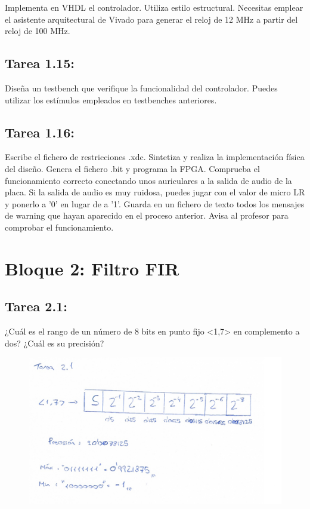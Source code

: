 \documentclass{article}
\begin{document}
Implementa en VHDL el controlador. Utiliza estilo estructural. Necesitas emplear el asistente arquitectural de Vivado para generar el reloj de 12 MHz a partir del reloj de 100 MHz.

\subsection{Tarea 1.15:}

Diseña un testbench que verifique la funcionalidad del controlador. Puedes utilizar los estímulos empleados en testbenches anteriores.

\subsection{Tarea 1.16:}

Escribe el fichero de restricciones .xdc. Sintetiza y realiza la implementación física del diseño. Genera el fichero .bit y programa la FPGA. Comprueba el funcionamiento correcto conectando unos auriculares a la salida de audio de la placa. Si la salida de audio es muy ruidosa, puedes jugar con el valor de micro LR y ponerlo a ’0’ en lugar de a '1'.
Guarda en un fichero de texto todos los mensajes de warning que hayan aparecido en el proceso anterior.
Avisa al profesor para comprobar el funcionamiento.

\section{Bloque 2: Filtro FIR}

\subsection{Tarea 2.1:}
¿Cuál es el rango de un número de 8 bits en punto fijo <1,7> en complemento a dos?
¿Cuál es su precisión?
\begin{figure}[H]
\centering
\includegraphics[width=1\linewidth]{images/2_1.png}
\end{figure}
\end{document}
